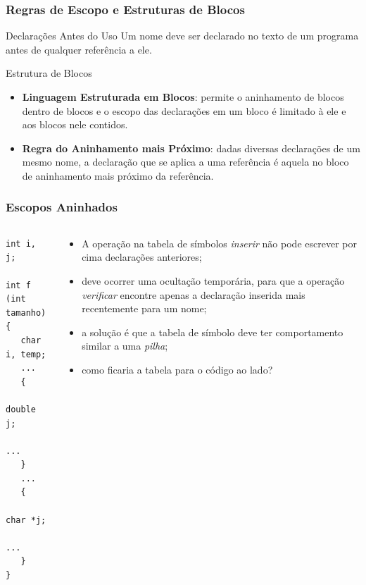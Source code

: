 \documentclass[table]{beamer}
\begin{document}
\begin{frame}
   \frametitle{Regras de Escopo e Estruturas de Blocos}
   \begin{block}{Declarações Antes do Uso}
   Um nome deve ser declarado no texto de um programa antes de qualquer referência a ele. 
   \end{block}
   \begin{block}{Estrutura de Blocos}
   \begin{itemize}
      \item \textbf{Linguagem Estruturada em Blocos}: permite o aninhamento de blocos dentro de blocos e o escopo das declarações em um bloco é limitado à ele e aos blocos nele contidos.
      \item \textbf{Regra do Aninhamento mais Próximo}: dadas diversas declarações de um mesmo nome, a declaração que se aplica a uma referência é aquela no bloco de aninhamento mais próximo da referência.
   \end{itemize}
   \end{block}
\end{frame}

\begin{frame}[fragile]
   \frametitle{Escopos Aninhados}
   \begin{columns}
   \begin{column}{0.5\textwidth}
   \begin{verbatim}
int i, j;

int f (int tamanho)
{
   char i, temp;
   ...
   {
      double j;
      ...
   }
   ...
   {
      char *j;
      ...
   }
}
   \end{verbatim}
   \end{column}
   \begin{column}{0.5\textwidth}
   \small
   \begin{itemize}
      \item A operação na tabela de símbolos \textit{inserir} não pode escrever por cima declarações anteriores;
      \item deve ocorrer uma ocultação temporária, para que a operação \textit{verificar} encontre apenas a declaração inserida mais recentemente para um nome;
      \item a solução é que a tabela de símbolo deve ter comportamento similar a uma \textit{pilha};
      \item como ficaria a tabela para o código ao lado?
   \end{itemize}
   \end{column}
   \end{columns}
\end{frame}
\end{document}
